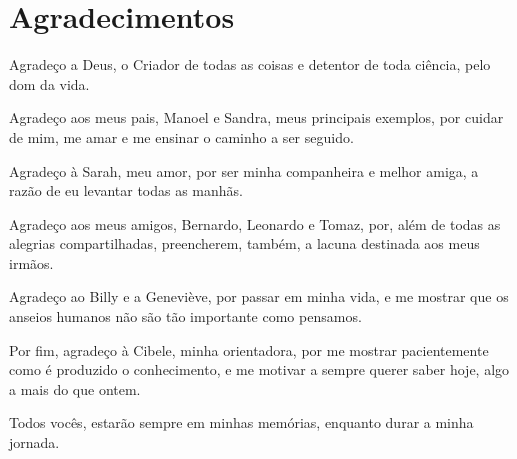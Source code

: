 \chapter*{Agradecimentos}

Agradeço a Deus, o Criador de todas as coisas e detentor de toda ciência, pelo dom da vida.

Agradeço aos meus pais, Manoel e Sandra, meus principais exemplos, por cuidar de mim, me amar e me ensinar o caminho a ser seguido.

Agradeço à Sarah, meu amor, por ser minha companheira e melhor amiga, a razão de eu levantar todas as manhãs.

Agradeço aos meus amigos, Bernardo, Leonardo e Tomaz, por, além de todas as alegrias compartilhadas, preencherem, também, a lacuna destinada aos meus irmãos.

Agradeço ao Billy e a Geneviève, por passar em minha vida, e me mostrar que os anseios humanos não são tão importante como pensamos.

Por fim, agradeço à Cibele, minha orientadora, por me mostrar pacientemente como é produzido o conhecimento, e me motivar a sempre querer saber hoje, algo a mais do que ontem.

Todos vocês, estarão sempre em minhas memórias, enquanto durar a minha jornada.
